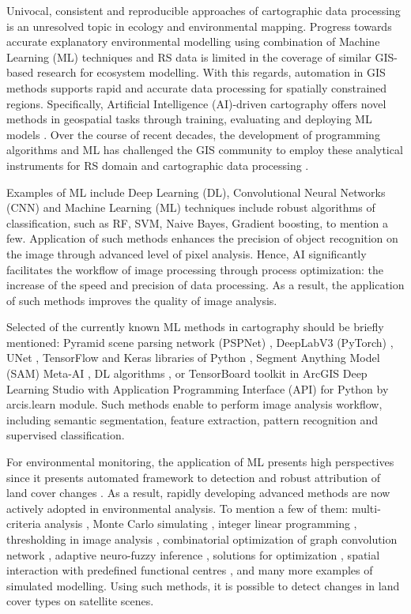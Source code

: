 \documentclass[sn-mathphys-num]{sn-jnl}%
\theoremstyle{thmstyleone}%
\theoremstyle{thmstyletwo}%
\theoremstyle{thmstylethree}%
\begin{document}
Univocal, consistent and reproducible approaches of cartographic data processing is an unresolved topic in ecology and environmental mapping. Progress towards accurate explanatory environmental modelling using combination of Machine
Learning (ML) techniques and RS data is limited in the coverage of similar GIS-based research for ecosystem modelling. With this regards, automation in GIS methods supports rapid and accurate data processing for spatially constrained regions. Specifically, Artificial Intelligence (AI)-driven cartography offers novel methods in geospatial tasks through training, evaluating and deploying ML models \cite{jmse12081279,Vahidnia02012019,Chenetal2023}. Over the course of recent decades, the development of programming algorithms and ML has challenged the GIS community to employ these analytical instruments for RS domain and cartographic data processing \cite{rs17122070,rs17162917}. 

Examples of ML include Deep Learning (DL), Convolutional Neural Networks (CNN) and Machine Learning (ML) techniques include robust algorithms of classification, such as RF, SVM, Naive Bayes, Gradient boosting, to mention a few. Application of such methods enhances the precision of object recognition on the image through advanced level of pixel analysis. Hence, AI significantly facilitates the workflow of image processing through process optimization: the increase of the speed and precision of data processing. As a result, the application of such methods improves the quality of image analysis.

Selected of the currently known ML methods in cartography should be briefly mentioned: Pyramid scene parsing network (PSPNet) \cite{ijgi12010014}, DeepLabV3 (PyTorch) \cite{rs17183145}, UNet \cite{rs14020358}, TensorFlow and Keras libraries of Python \cite{rs11232881}, Segment Anything Model (SAM) Meta-AI \cite{rs16091505}, DL algorithms \cite{w16081141}, or TensorBoard toolkit in ArcGIS Deep Learning Studio with Application Programming Interface (API) for Python by arcis.learn module. Such methods enable to perform image analysis workflow, including semantic segmentation, feature extraction, pattern recognition and supervised classification.

For environmental monitoring, the application of ML presents high perspectives since it presents automated framework to detection and robust attribution of land cover changes \cite{6069282,10170600,Lemenkova20201734,8526926}. As a result, rapidly developing advanced methods are now actively adopted in environmental analysis. To mention a few of them: multi-criteria analysis \cite{w17081212}, Monte Carlo simulating \cite{app15126575,w12071913,w16162302}, integer linear programming \cite{buildings14010213}, thresholding in image analysis \cite{AFJAL2019514}, combinatorial optimization of graph convolution network \cite{ijgi11050270}, adaptive neuro-fuzzy inference \cite{ijgi10060382,Pradhan2019}, solutions for optimization \cite{land12091786,Lemenkova202312,su16135660}, spatial interaction with predefined functional centres \cite{Kim03032016,urbansci5010007}, and many more examples of simulated modelling. Using such methods, it is possible to detect changes in land cover types on satellite scenes.
\end{document}
